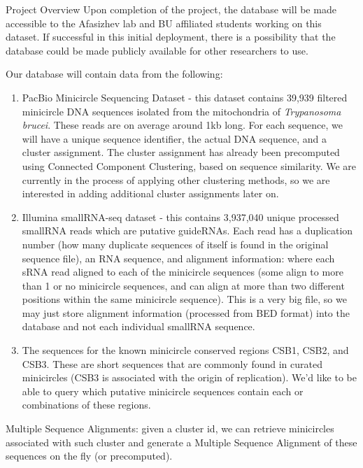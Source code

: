 \documentclass[a4paper,10pt,notitlepage]{article}
\begin{document}
\begin{section}{Project Overview}
Upon completion of the project, the database will be made accessible to the Afasizhev lab and BU affiliated 
students working on this dataset. If successful in this initial deployment, there is a possibility that the 
database could be made publicly available for other researchers to use.


Our database will contain data from the following:

\begin{enumerate}
\item PacBio Minicircle Sequencing Dataset - this dataset contains 39,939 filtered minicircle DNA sequences isolated from the 
    mitochondria of \emph{Trypanosoma brucei}. These reads are on average around 1kb long. For each sequence, we will have a unique sequence 
identifier, the actual DNA sequence, and a cluster assignment. The cluster assignment has already been precomputed using Connected 
Component Clustering, based on sequence similarity. We are currently in the process of applying other clustering methods, 
so we are interested in adding additional cluster assignments later on.
\item Illumina smallRNA-seq dataset - this contains 3,937,040 unique processed smallRNA reads which are putative 
guideRNAs. Each read has a duplication number (how many duplicate sequences of itself is found in the original 
sequence file), an RNA sequence, and alignment information: where each sRNA read aligned to each of the 
minicircle sequences (some align to more than 1 or no minicircle sequences, and can align at more than two 
different positions within the same minicircle sequence). This is a very big file, so we may just store alignment
information (processed from BED format) into the database and not each individual smallRNA sequence.
\item The sequences for the known minicircle conserved regions CSB1, CSB2, and CSB3. These are short sequences that are commonly 
found in curated minicircles (CSB3 is associated with the origin of replication). We’d like to be able to query which putative 
minicircle sequences contain each or combinations of these regions. 
    \end{enumerate}

Multiple Sequence Alignments: given a cluster id, we can retrieve minicircles associated with such cluster and 
generate a Multiple Sequence Alignment of these sequences on the fly (or precomputed).


\end{section}
\end{document}
